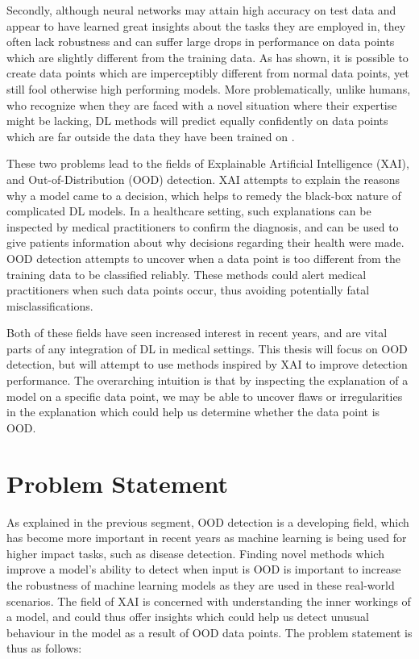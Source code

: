 \documentclass[UKenglish]{uiomasterthesis} %
\theoremstyle{definition}
\begin{document}
Secondly, although neural networks may attain high accuracy on test data and appear to have learned great insights about the tasks they are employed in, they often lack robustness and can suffer large drops in performance on data points which are slightly different from the training data. As \cite{intriguing} has shown, it is possible to create data points which are imperceptibly different from normal data points, yet still fool otherwise high performing models. More problematically, unlike humans, who recognize when they are faced with a novel situation where their expertise might be lacking, DL methods will predict equally confidently on data points which are far outside the data they have been trained on \cite{tingsim}.

These two problems lead to the fields of Explainable Artificial Intelligence (XAI), and Out-of-Distribution (OOD) detection. XAI attempts to explain the reasons why a model came to a decision, which helps to remedy the black-box nature of complicated DL models. In a healthcare setting, such explanations can be inspected by medical practitioners to confirm the diagnosis, and can be used to give patients information about why decisions regarding their health were made. OOD detection attempts to uncover when a data point is too different from the training data to be classified reliably. These methods could alert medical practitioners when such data points occur, thus avoiding potentially fatal misclassifications.

Both of these fields have seen increased interest in recent years, and are vital parts of any integration of DL in medical settings. This thesis will focus on OOD detection, but will attempt to use methods inspired by XAI to improve detection performance. The overarching intuition is that by inspecting the explanation of a model on a specific data point, we may be able to uncover flaws or irregularities in the explanation which could help us determine whether the data point is OOD.


\section{Problem Statement}

As explained in the previous segment, OOD detection is a developing field, which has become more important in recent years as machine learning is being used for higher impact tasks, such as disease detection. Finding novel methods which improve a model's ability to detect when input is OOD is important to increase the robustness of machine learning models as they are used in these real-world scenarios. The field of XAI is concerned with understanding the inner workings of a model, and could thus offer insights which could help us detect unusual behaviour in the model as a result of OOD data points. The problem statement is thus as follows:
\end{document}

